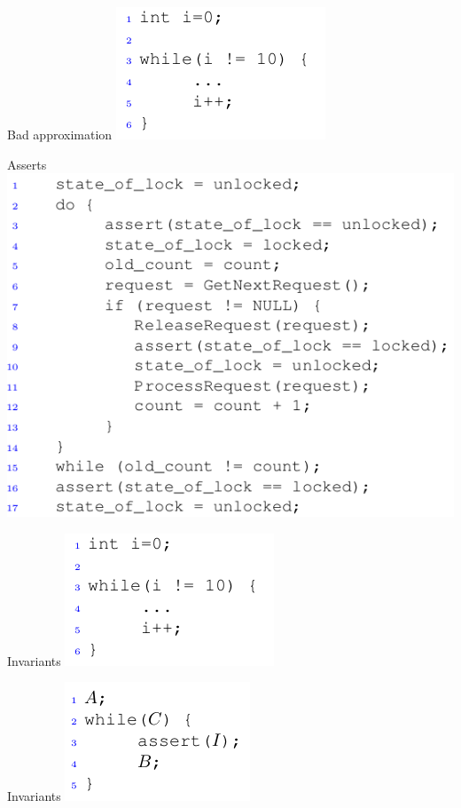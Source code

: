 \documentclass{beamer}
\begin{document}
\begin{frame}{Bad approximation}
\includegraphics[scale=0.45]{li1.png}
\end{frame}

\begin{frame}{Asserts}
\includegraphics[scale=0.5]{asserts.png}
\end{frame}

\begin{frame}{Invariants}
\includegraphics[scale=0.45]{li1.png}
\end{frame}

\begin{frame}{Invariants}
\includegraphics[scale=0.45]{li2.png}
\end{frame}
\end{document}
